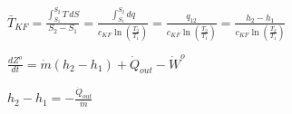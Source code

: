 \( \bar{T}_{KF} = \frac{\int_{S_1}^{S_2} T \, dS}{S_2 - S_1} = \frac{\int_{S_1}^{S_2} dq}{c_{KF} \ln \left( \frac{T_2}{T_1} \right)} = \frac{q_{12}}{c_{KF} \ln \left( \frac{T_2}{T_1} \right)} = \frac{h_2 - h_1}{c_{KF} \ln \left( \frac{T_2}{T_1} \right)} \)  

\( \frac{dZ^o}{dt} = \dot{m} (h_2 - h_1) + \dot{Q}_{out} - \dot{W}^o \)  

\( h_2 - h_1 = - \frac{\dot{Q}_{out}}{\dot{m}} \)